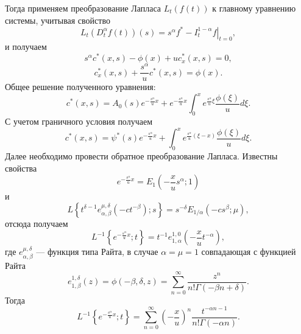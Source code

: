 Тогда применяем преобразование Лапласа $L_t(f(t))$ к главному уравнению системы, учитывая свойство
\begin{equation}
	L_t(D^\alpha_tf(t))(s) = s^\alpha f^* - \left. I^{1-\alpha}_tf \right|_{t=0},
\end{equation}
и получаем
\begin{equation}
	s^\alpha c^*(x,s) - \phi(x) + u c^*_x(x,s) = 0,
\end{equation}
\begin{equation}
	c^*_x(x,s) + \frac{s^\alpha}{u}c^*(x,s) = \phi(x).
\end{equation}
Общее решение полученного уравнения:
\begin{equation}
	c^*(x,s) = A_0(s)e^{-\frac{s^\alpha}{u}x} + e^{-\frac{s^\alpha}{u}x} \int_0^x e^{\frac{s^\alpha}{u}\xi} \frac{\phi(\xi)}{u} d \xi.
\end{equation}
С учетом граничного условия получаем
\begin{equation}
	c^*(x,s) = \psi^*(s)e^{-\frac{s^\alpha}{u}x} + \int_0^x e^{\frac{s^\alpha}{u}(\xi - x)} \frac{\phi(\xi)}{u} d \xi.
\end{equation}
Далее необходимо провести обратное преобразование Лапласа. Известны свойства
\begin{equation}
	e^{-\frac{s^\alpha}{u}x} = E_1\left(-\frac{x}{u}s^\alpha; 1\right)
\end{equation}
и
\begin{equation}
	L\left\{t^{\delta - 1}e_{\alpha, \beta}^{\mu, \delta}\left(-ct^{-\beta}\right); s\right\}=
	s^{-\delta}E_{1 / \alpha}\left(-cs^\beta; \mu\right),
\end{equation}
отсюда получаем
\begin{equation}
	L^{-1}\left\{e^{-\frac{s^\alpha}{u}x}; t\right\} = t^{-1} e^{1,0}_{1, \alpha}\left(-\frac{x}{u}t^{-\alpha}\right),
\end{equation}
где $e_{\alpha, \beta}^{\mu, \delta}$ --- функция типа Райта, в случае $\alpha = \mu = 1$ совпадающая с функцией Райта
\begin{equation}
	e_{1, \beta}^{1, \delta}(z) = \phi\left(-\beta, \delta, z\right) =
	\sum_{n=0}^\infty\frac{z^n}{n!\Gamma(-\beta n + \delta)}.
\end{equation}
Тогда
\begin{equation}
	L^{-1}\left\{e^{-\frac{s^\alpha}{u}x}; t\right\} = 
	\sum_{n=0}^\infty\left(-\frac{x}{u}\right)^n \frac{t^{-\alpha n - 1}}{n!\Gamma(-\alpha n)}.
\end{equation}

